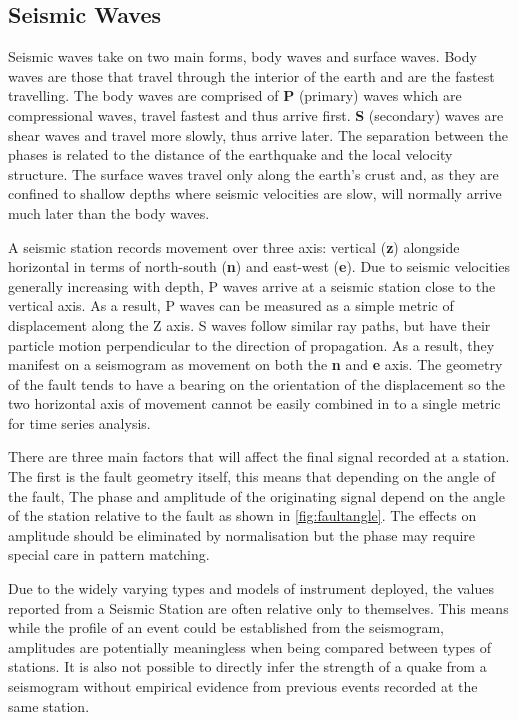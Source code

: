 \documentclass[../report.tex]{subfiles}
\begin{document}
	
\subsection{Seismic Waves} \label{sec:seismicwaves}
	Seismic waves take on two main forms, body waves and surface waves.  Body waves are those that travel through the interior of the earth and are the fastest travelling.  The body waves are comprised of \textbf{P} (primary) waves which are compressional waves, travel fastest and thus arrive first.  \textbf{S} (secondary) waves are shear waves and travel more slowly, thus arrive later.  The separation between the phases is related to the distance of the earthquake and the local velocity structure. The surface waves travel only along the earth's crust and, as they are confined to shallow depths where seismic velocities are slow, will normally arrive much later than the body waves.
	
	A seismic station records movement over three axis: vertical (\textbf{z}) alongside horizontal in terms of north-south (\textbf{n}) and east-west (\textbf{e}).  Due to seismic velocities generally increasing with depth, P waves arrive at a seismic station close to the vertical axis.  As a result, P waves can be measured as a simple metric of displacement along the Z axis.  S waves follow similar ray paths, but have their particle motion perpendicular to the direction of propagation.  As a result, they manifest on a seismogram as movement on both the \textbf{n} and \textbf{e} axis. The geometry of the fault tends to have a bearing on the orientation of the displacement so the two horizontal axis of movement cannot be easily combined in to a single metric for time series analysis.
	
	There are three main factors that will affect the final signal recorded at a station.  The first is the fault geometry itself, this means that depending on the angle of the fault, The phase and amplitude of the originating signal depend on the angle of the station relative to the fault as shown in \cref{fig:faultangle}.  The effects on amplitude should be eliminated by normalisation but the phase may require special care in pattern matching.
	
	Due to the widely varying types and models of instrument deployed, the values reported from a Seismic Station are often relative only to themselves.  This means while the profile of an event could be established from the seismogram, amplitudes are potentially meaningless when being compared between types of stations.  It is also not possible to directly infer the strength of a quake from a seismogram without empirical evidence from previous events recorded at the same station.
	
\end{document}
